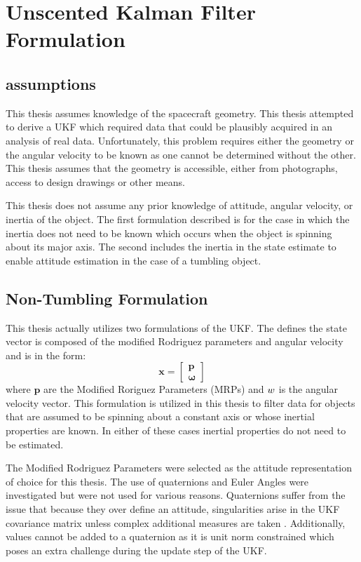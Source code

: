 \chapter{Unscented Kalman Filter Formulation}

\section{assumptions}

This thesis assumes knowledge of the spacecraft geometry. This thesis attempted to derive a UKF which required data that could be plausibly acquired in an analysis of real data. Unfortunately, this problem requires either the geometry or the angular velocity to be known as one cannot be determined without the other. This thesis assumes that the geometry is accessible, either from photographs, access to design drawings or other means.

This thesis does not assume any prior knowledge of attitude, angular velocity, or inertia of the object. The first formulation described is for the case in which the inertia does not need to be known which occurs when the object is spinning about its major axis. The second includes the inertia in the state estimate to enable attitude estimation in the case of a tumbling object.

\section{Non-Tumbling Formulation}
This thesis actually utilizes two formulations of the UKF. The defines the state vector is composed of the modified Rodriguez parameters and angular velocity and is in the form:
\begin{equation}
\bm{x} = \begin{bmatrix} \bm{p} \\ \bm{\omega} \end{bmatrix}
\end{equation}
where $\bm{p}$ are the Modified Roriguez Parameters (MRPs) and  $\boldmath{w}$ is the angular velocity vector. This formulation is utilized in this thesis to filter data for objects that are assumed to be spinning about a constant axis or whose inertial properties are known. In either of these cases inertial properties do not need to be estimated.

The Modified Rodriguez Parameters were selected as the attitude representation of choice for this thesis. The use of quaternions and Euler Angles were investigated but were not used for various reasons. Quaternions suffer from the issue that because they over define an attitude, singularities arise in the UKF covariance matrix unless complex additional measures are taken \cite{Linares_data_fusion}. Additionally, values cannot be added to a quaternion as it is unit norm constrained which poses an extra challenge during the update step of the UKF.

